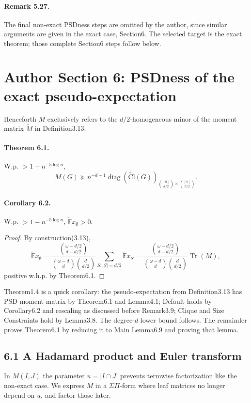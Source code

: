 \documentclass[10pt,a4paper]{article}
\begin{document}
\paragraph{Remark 5.27.} The final non-exact PSDness steps are omitted by the author, since similar arguments are given in the exact case, Section6. The selected target is the exact theorem; those complete Section6 steps follow below.

\section*{Author Section 6: PSDness of the exact pseudo-expectation}
Henceforth $M$ exclusively refers to the $d/2$-homogeneous minor of the moment matrix $\widetilde M$ in Definition3.13.
\paragraph{Theorem 6.1.} W.p. $>1-n^{-5\log n}$,
\[M(G)\succeq n^{-d-1}\operatorname{diag}(\widetilde{\mathrm{Cl}}(G))_{\binom{[n]}{d/2}\times\binom{[n]}{d/2}}.\]
\paragraph{Corollary 6.2.} W.p. $>1-n^{-5\log n}$, $\widetilde{\mathbb E}x_\emptyset>0$.
\begin{proof}By construction(3.13),
\[\widetilde{\mathbb E}x_\emptyset=\frac{\binom{\omega-d/2}{d-d/2}}{\binom{\omega-d}d\binom d{d/2}}\sum_{S:|S|=d/2}\widetilde{\mathbb E}x_S=\frac{\binom{\omega-d/2}{d-d/2}}{\binom{\omega-d}d\binom d{d/2}}\operatorname{Tr}(M),\]
positive w.h.p. by Theorem6.1.\end{proof}
Theorem1.4 is a quick corollary: the pseudo-expectation from Definition3.13 has PSD moment matrix by Theorem6.1 and Lemma4.1; Default holds by Corollary6.2 and rescaling as discussed before Remark3.9; Clique and Size Constraints hold by Lemma3.8. The degree-$d$ lower bound follows. The remainder proves Theorem6.1 by reducing it to Main Lemma6.9 and proving that lemma.
\subsection*{6.1 A Hadamard product and Euler transform}
In $M(I,J)$ the parameter $u=|I\cap J|$ prevents termwise factorization like the non-exact case. We express $M$ in a $\Sigma\Pi$-form where leaf matrices no longer depend on $u$, and factor those later.
\end{document}
